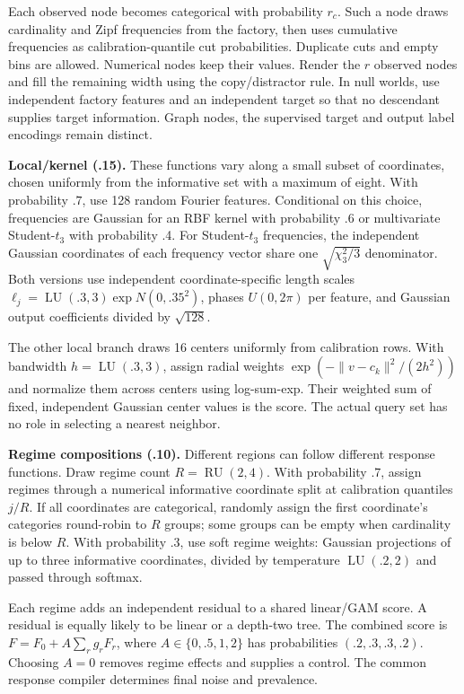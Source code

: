 \documentclass[11pt]{article}
\begin{document}
Each observed node becomes categorical with probability $r_c$. Such a node draws cardinality and Zipf frequencies from the factory, then uses cumulative frequencies as calibration-quantile cut probabilities. Duplicate cuts and empty bins are allowed. Numerical nodes keep their values. Render the $r$ observed nodes and fill the remaining width using the copy/distractor rule. In null worlds, use independent factory features and an independent target so that no descendant supplies target information. Graph nodes, the supervised target and output label encodings remain distinct.

\textbf{Local/kernel (.15).} These functions vary along a small subset of coordinates, chosen uniformly from the informative set with a maximum of eight. With probability $.7$, use 128 random Fourier features. Conditional on this choice, frequencies are Gaussian for an RBF kernel with probability .6 or multivariate Student-$t_3$ with probability .4. For Student-$t_3$ frequencies, the independent Gaussian coordinates of each frequency vector share one $\sqrt{\chi^2_3/3}$ denominator. Both versions use independent coordinate-specific length scales $\ell_j=\operatorname{LU}(.3,3)\exp N(0,.35^2)$, phases $U(0,2\pi)$ per feature, and Gaussian output coefficients divided by $\sqrt{128}$.

The other local branch draws 16 centers uniformly from calibration rows. With bandwidth $h=\operatorname{LU}(.3,3)$, assign radial weights $\exp(-\|v-c_k\|^2/(2h^2))$ and normalize them across centers using log-sum-exp. Their weighted sum of fixed, independent Gaussian center values is the score. The actual query set has no role in selecting a nearest neighbor.

\textbf{Regime compositions (.10).} Different regions can follow different response functions. Draw regime count $R=\operatorname{RU}(2,4)$. With probability .7, assign regimes through a numerical informative coordinate split at calibration quantiles $j/R$. If all coordinates are categorical, randomly assign the first coordinate's categories round-robin to $R$ groups; some groups can be empty when cardinality is below $R$. With probability .3, use soft regime weights: Gaussian projections of up to three informative coordinates, divided by temperature $\operatorname{LU}(.2,2)$ and passed through softmax.

Each regime adds an independent residual to a shared linear/GAM score. A residual is equally likely to be linear or a depth-two tree. The combined score is $F=F_0+A\sum_rg_rF_r$, where $A\in\{0,.5,1,2\}$ has probabilities $(.2,.3,.3,.2)$. Choosing $A=0$ removes regime effects and supplies a control. The common response compiler determines final noise and prevalence.
\end{document}
